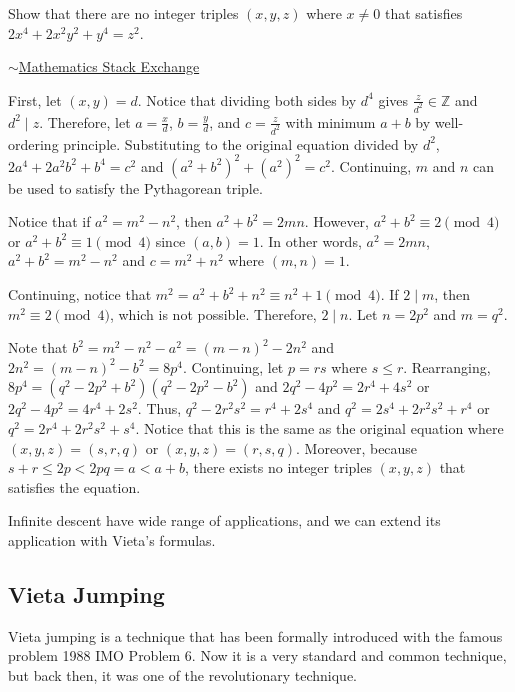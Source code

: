 \documentclass[../../../main.tex]{subfiles}
\begin{document}
\begin{problem}{}{}
Show that there are no integer triples $(x, y, z)$ where $x \neq 0$
that satisfies $2x^4 + 2x^2y^2 + y^4 = z^2$.

\hfill$\sim$\href{https://math.stackexchange.com/questions/4892263/diophantine-equation-2x4-2x2-y2-y4-z2}{Mathematics Stack Exchange}
\end{problem}
\begin{solution}
First, let $(x, y) = d$. Notice that dividing both sides by $d^4$
gives $\frac{z}{d^2} \in \mathbb{Z}$ and $d^2 \mid z$. Therefore,
let $a = \frac{x}{d}$, $b = \frac{y}{d}$, and $c = \frac{z}{d^2}$
with minimum $a + b$ by well-ordering principle. Substituting to the
original equation divided by $d^2$, $2a^4 + 2a^2b^2 + b^4 = c^2$
and $(a^2 + b^2)^2 + (a^2)^2 = c^2$. Continuing, $m$ and $n$ can be
used to satisfy the Pythagorean triple.

Notice that if $a^2 = m^2 - n^2$, then $a^2 + b^2 = 2mn$. However,
$a^2 + b^2 \equiv 2 \pmod{4}$ or $a^2 + b^2 \equiv 1 \pmod{4}$
since $(a, b) = 1$. In other words, $a^2 = 2mn$, $a^2 + b^2 =
m^2 - n^2$ and $c = m^2 + n^2$ where $(m, n) = 1$.

Continuing, notice that $m^2 = a^2 + b^2 + n^2 \equiv n^2 + 1
\pmod{4}$. If $2 \mid m$, then $m^2 \equiv 2 \pmod{4}$, which is not
possible. Therefore, $2 \mid n$. Let $n = 2p^2$ and $m = q^2$.

Note that $b^2 = m^2 - n^2 - a^2 = (m - n)^2 - 2n^2$ and
$2n^2 = (m - n)^2 - b^2 = 8p^4$. Continuing, let $p = rs$
where $s \leq r$. Rearranging, $8p^4 = (q^2 - 2p^2 + b^2)
(q^2 - 2p^2 - b^2)$ and $2q^2 - 4p^2 = 2r^4 + 4s^2$ or
$2q^2 - 4p^2 = 4r^4 + 2s^2$. Thus, $q^2 - 2r^2s^2 = r^4 + 2s^4$ and
$q^2 = 2s^4 + 2r^2s^2 + r^4$ or $q^2 = 2r^4 + 2r^2s^2 + s^4$.
Notice that this is the same as the original equation where
$(x, y, z) = (s, r, q)$ or $(x, y, z) = (r, s, q)$. Moreover,
because $s + r \leq 2p < 2pq = a < a + b$, there exists no integer
triples $(x, y, z)$ that satisfies the equation.
\end{solution}

Infinite descent have wide range of applications, and we can
extend its application with Vieta's formulas.

\subsection{Vieta Jumping}

Vieta jumping is a technique that has been formally introduced
with the famous problem 1988 IMO Problem 6. Now it is a very
standard and common technique, but back then, it was one of the
revolutionary technique.
\end{document}
